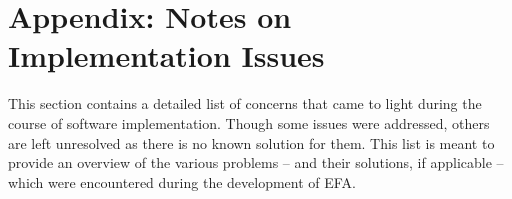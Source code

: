 

\chapter*{Appendix: Notes on Implementation Issues}

This section contains a detailed list of concerns that came to light during the
course of software implementation. Though some issues were addressed, others are
left unresolved as there is no known solution for them. This list is meant to
provide an overview of the various problems -- and their solutions, if
applicable -- which were encountered during the development of EFA. 

